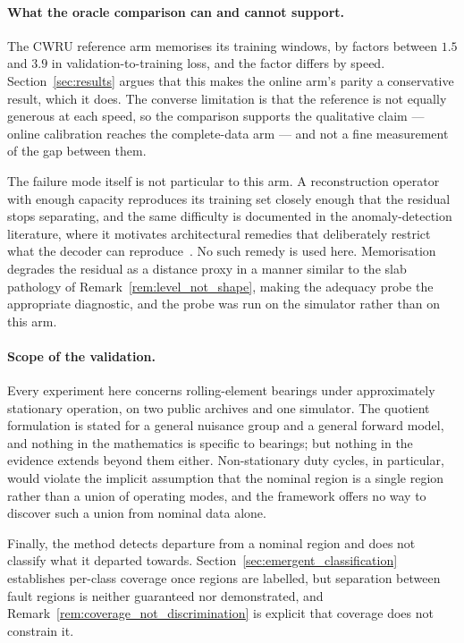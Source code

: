 \documentclass[a4paper]{cas-sc}
\begin{document}
\paragraph{What the oracle comparison can and cannot support.}
The CWRU reference arm memorises its training windows, by factors between
\(1.5\) and \(3.9\) in validation-to-training loss, and the factor differs by
speed. Section~\ref{sec:results} argues that this makes the online arm's
parity a conservative result, which it does. The converse limitation is that
the reference is not equally generous at each speed, so the comparison
supports the qualitative claim --- online calibration reaches the complete-data
arm --- and not a fine measurement of the gap between them.

The failure mode itself is not particular to this arm. A reconstruction
operator with enough capacity reproduces its training set closely enough that
the residual stops separating, and the same difficulty is documented in the
anomaly-detection literature, where it motivates architectural remedies that
deliberately restrict what the decoder can reproduce~\citep{gong2019memae}. No
such remedy is used here. Memorisation degrades the
residual as a distance proxy in a manner similar to the slab pathology of
Remark~\ref{rem:level_not_shape}, making the adequacy probe the appropriate
diagnostic, and the probe was run on the simulator rather than on this
arm.

\paragraph{Scope of the validation.}
Every experiment here concerns rolling-element bearings under approximately
stationary operation, on two public archives and one simulator. The quotient
formulation is stated for a general nuisance group and a general forward
model, and nothing in the mathematics is specific to bearings; but nothing in
the evidence extends beyond them either. Non-stationary duty cycles, in
particular, would violate the implicit assumption that the nominal region is a
single region rather than a union of operating modes, and the framework offers
no way to discover such a union from nominal data alone.

Finally, the method detects departure from a nominal region and does not
classify what it departed towards. Section~\ref{sec:emergent_classification}
establishes per-class coverage once regions are labelled, but separation
between fault regions is neither guaranteed nor demonstrated, and
Remark~\ref{rem:coverage_not_discrimination} is explicit that coverage does
not constrain it.
\end{document}
